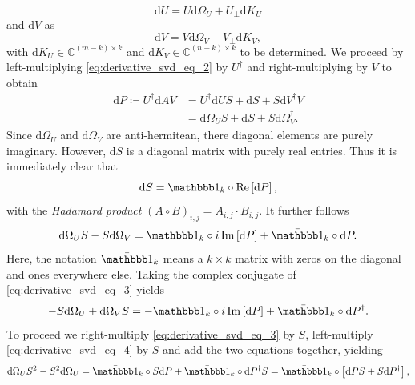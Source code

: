 \begin{equation}
	\label{eq:dOmega_U_definition}
	\text{d}U = U\text{d}\Omega_U + U_\perp\text{d}K_U
\end{equation}
and $\text{d}V$ as
\begin{equation}
	\label{eq:dOmega_V_definition}
	\text{d}V = V\text{d}\Omega_V + V_\perp\text{d}K_V,
\end{equation}
with $\text{d}K_U\in\mathbb{C}^{(m-k)\times k}$ and $\text{d}K_V\in\mathbb{C}^{(n-k)\times k}$ to be determined. We proceed by left-multiplying \eqref{eq:derivative_svd_eq_2} by $U^\dagger$ and right-multiplying by $V$ to obtain
\begin{equation}
	\label{eq:svd_derivative_P_definition}
	\begin{split}
		\text{d}P \coloneqq U^\dagger\text{d}AV &= U^\dagger\text{d}US + \text{d}S + S\text{d}V^\dagger V \\
		&= \text{d}\Omega_U S + \text{d}S + S\text{d}\Omega_V^\dagger.
	\end{split}
\end{equation}
Since $\text{d}\Omega_U$ and $\text{d}\Omega_V$ are anti-hermitean, there diagonal elements are purely imaginary. However, $\text{d}S$ is a diagonal matrix with purely real entries. Thus it is immediately clear that
\begin{equation}
	\label{eq:dS_final}
	\text{d}S = \id_k \circ \Re\left[\text{d}P\right],
\end{equation}
with the \textit{Hadamard product} $(A\circ B)_{i,j} = A_{i,j}\cdot B_{i,j}$. It further follows
\begin{equation}
	\label{eq:derivative_svd_eq_3}
	\text{d}\Omega_US - S\text{d}\Omega_V = \id_k\circ i\Im\left[\text{d}P\right] + \bar{\id}_k\circ\text{d}P.
\end{equation}
Here, the notation $\bar{\id}_k$ means a $k\times k$ matrix with zeros on the diagonal and ones everywhere else. Taking the complex conjugate of \eqref{eq:derivative_svd_eq_3} yields \begin{equation}
	\label{eq:derivative_svd_eq_4}
	-S\text{d}\Omega_U + \text{d}\Omega_V S = -\id_k\circ i\Im\left[\text{d}P\right] + \bar{\id}_k\circ\text{d}P^\dagger.
\end{equation}
To proceed we right-multiply \eqref{eq:derivative_svd_eq_3} by $S$, left-multiply \eqref{eq:derivative_svd_eq_4} by $S$ and add the two equations together, yielding
\begin{equation}
	\label{eq:equation_for_solving_dOmega_U}
	\text{d}\Omega_U S^2 - S^2 \text{d}\Omega_U = \bar{\id}_k\circ S\text{d}P + \bar{\id}_k\circ \text{d}P^\dagger S = \bar{\id}_k\circ\left[\text{d}PS+S\text{d}P^\dagger\right],
\end{equation}
